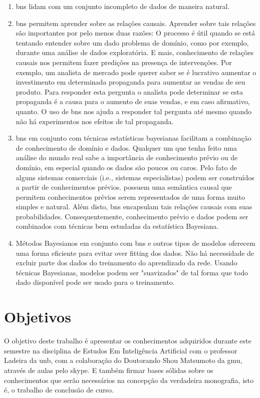 \begin{enumerate}
	\item \glspl{bn} lidam com um conjunto incompleto de dados de maneira natural.

	\item \glspl{bn} permitem aprender sobre as relações causais. Aprender sobre tais relações são importantes por pelo menos duas razões: O processo é útil quando se está tentando entender sobre um dado problema de domínio, como por exemplo, durante uma análise de dados exploratória.  E mais, conhecimento de relações causais nos permitem fazer predições na presença de intervenções. Por exemplo, um analista de mercado pode querer saber se é lucrativo aumentar o investimento em determinada propaganda para aumentar as vendas de seu produto. Para responder esta pergunta o analista pode determinar se esta propaganda é a causa para o aumento de suas vendas, e em caso afirmativo, quanto. O uso de \glspl{bn} nos ajuda a responder tal pergunta até mesmo quando não há experimentos nos efeitos de tal propaganda.
	
	\item \glspl{bn} em conjunto com técnicas estatísticas bayesianas facilitam a combinação de conhecimento de domínio e dados. Qualquer um que tenha feito uma análise do mundo real sabe a importância de conhecimento prévio ou de domínio, em especial quando os dados são poucos ou caros. Pelo fato de alguns sistemas comerciais (i.e., sistemas especialistas) podem ser construídos a partir de conhecimentos prévios.  possuem uma semântica causal que permitem conhecimentos prévios serem representados de uma forma muito simples e natural. Além disto, \glspl{bn} encapsulam tais relações causais com suas probabilidades. Consequentemente, conhecimento prévio e dados podem ser combinados com técnicas bem estudadas da estatística Bayesiana.
	
	\item Métodos Bayesianos em conjunto com \glspl{bn} e outros tipos de modelos oferecem uma forma eficiente para evitar over fitting dos dados. Não há necessidade de excluir parte dos dados do treinamento do aprendizado da rede. Usando técnicas Bayesianas, modelos podem ser "suavizados" de tal forma que todo dado disponível pode ser usado para o treinamento.

\end{enumerate}

\section{Objetivos}
O objetivo deste trabalho é apresentar os conhecimentos adquiridos durante este semestre na disciplina de Estudos Em Inteligência Artificial com o professor Ladeira da \gls{unb}, com a colaboração do Doutorando Shou Matsumoto da \gls{gmu}, através de aulas pelo skype. E também firmar bases sólidas sobre os conhecimentos que serão necessários na concepção da verdadeira monografia, isto é, o trabalho de conclusão de curso.


